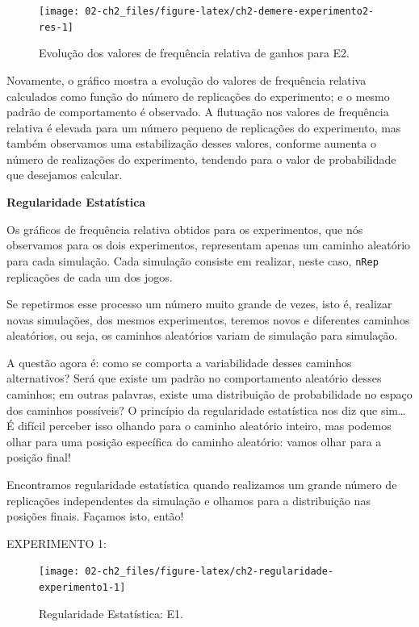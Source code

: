 \documentclass[
]{book}
\theoremstyle{definition}
\theoremstyle{definition}
\theoremstyle{definition}
\theoremstyle{remark}
\begin{document}
\begin{figure}
\texttt{[image: 02-ch2\_files/figure-latex/ch2-demere-experimento2-res-1]} \caption{Evolução dos valores de frequência relativa de ganhos para E2.}\label{fig:ch2-demere-experimento2-res}
\end{figure}

Novamente, o gráfico mostra a evolução do valores de frequência relativa calculados como função do número de replicações do experimento; e o mesmo padrão de comportamento é observado. A flutuação nos valores de frequência relativa é elevada para um número pequeno de replicações do experimento, mas também observamos uma estabilização desses valores, conforme aumenta o número de realizações do experimento, tendendo para o valor de probabilidade que desejamos calcular.

\textbf{Regularidade Estatística}

Os gráficos de frequência relativa obtidos para os experimentos, que nós observamos para os dois experimentos, representam apenas um caminho aleatório para cada simulação. Cada simulação consiste em realizar, neste caso, \texttt{nRep} replicações de cada um dos jogos.

Se repetirmos esse processo um número muito grande de vezes, isto é, realizar novas simulações, dos mesmos experimentos, teremos novos e diferentes caminhos aleatórios, ou seja, os caminhos aleatórios variam de simulação para simulação.

A questão agora é: como se comporta a variabilidade desses caminhos alternativos? Será que existe um padrão no comportamento aleatório desses caminhos; em outras palavras, existe uma distribuição de probabilidade no espaço dos caminhos possíveis? O princípio da regularidade estatística nos diz que sim\ldots{} É difícil perceber isso olhando para o caminho aleatório inteiro, mas podemos olhar para uma posição específica do caminho aleatório: vamos olhar para a posição final!

Encontramos regularidade estatística quando realizamos um grande número de replicações independentes da simulação e olhamos para a distribuição nas posições finais. Façamos isto, então!

EXPERIMENTO 1:

\begin{figure}
\texttt{[image: 02-ch2\_files/figure-latex/ch2-regularidade-experimento1-1]} \caption{Regularidade Estatística: E1.}\label{fig:ch2-regularidade-experimento1}
\end{figure}
\end{document}
